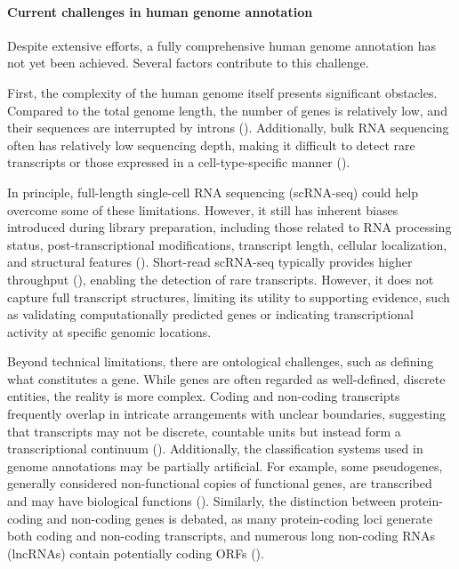 \paragraph{Current challenges in human genome annotation}

Despite extensive efforts, a fully comprehensive human genome annotation has not yet been achieved.
Several factors contribute to this challenge.

First, the complexity of the human genome itself presents significant obstacles.
Compared to the total genome length, the number of genes is relatively low, and their sequences are interrupted by introns (\cite{Salzberg2019}).
Additionally, bulk RNA sequencing often has relatively low sequencing depth,
making it difficult to detect rare transcripts or those expressed in a cell-type-specific manner (\cite{Guigo2023}).

In principle, full-length single-cell RNA sequencing (scRNA-seq) could help overcome some of these limitations.
However, it still has inherent biases introduced during library preparation, including those related to RNA processing status,
post-transcriptional modifications, transcript length, cellular localization, and structural features (\cite{Guigo2023}).
Short-read scRNA-seq typically provides higher throughput (\cite{Heumos2023}), enabling the detection of rare transcripts.
However, it does not capture full transcript structures, limiting its utility to supporting evidence,
such as validating computationally predicted genes or indicating transcriptional activity at specific genomic locations.

Beyond technical limitations, there are ontological challenges, such as defining what constitutes a gene.
While genes are often regarded as well-defined, discrete entities, the reality is more complex.
Coding and non-coding transcripts frequently overlap in intricate arrangements with unclear boundaries,
suggesting that transcripts may not be discrete, countable units but instead form a transcriptional continuum (\cite{Salzberg2019}).
Additionally, the classification systems used in genome annotations may be partially artificial.
For example, some pseudogenes, generally considered non-functional copies of functional genes,
are transcribed and may have biological functions (\cite{Pei2012}).
Similarly, the distinction between protein-coding and non-coding genes is debated, as many protein-coding loci generate both coding
and non-coding transcripts, and numerous long non-coding RNAs (lncRNAs) contain potentially coding ORFs (\cite{Salzberg2019}).

